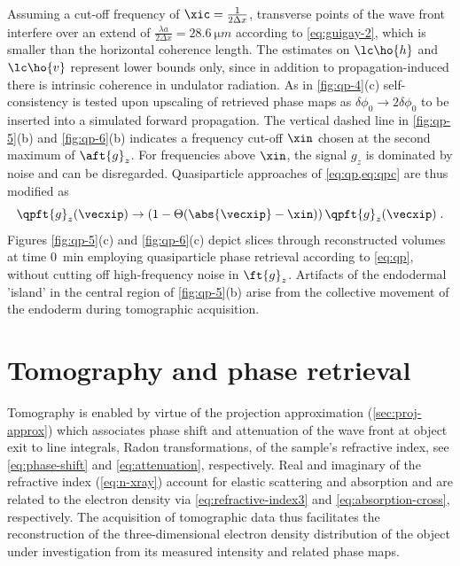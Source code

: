 \documentclass[
twoside,
openright,
titlepage,
numbers=noenddot,
headinclude,
fleqn,
a4paper,
footinclude=true,
cleardoublepage=empty,
abstractoff,
BCOR=5mm,
paper=a4,
fontsize=11pt,
british,ngerman,american,
]{scrreprt}
\begin{document}
Assuming a cut-off frequency of $\xic=\frac{1}{2\Delta x}$, transverse
points of the wave front interfere over an extend of $\frac{\lambda
  a}{2\Delta x}=\SI{28.6}{\micro m}$ according to \cref{eq:guigay-2},
which is smaller than the horizontal coherence length.  The estimates
on $\lc\ho{h}$ and $\lc\ho{v}$ represent lower bounds only, since in
addition to propagation-induced there is intrinsic coherence in
undulator radiation.  As in \cref{fig:qp-4}(c) self-consistency is
tested upon upscaling of retrieved phase maps as
$\delta\phi_0\to2\delta\phi_0$ to be inserted into a simulated forward
propagation.  The vertical dashed line in \cref{fig:qp-5}(b) and
\eqref{fig:qp-6}(b) indicates a frequency cut-off $\xin$ chosen at the
second maximum of $\aft{g}_z$.  For frequencies above $\xin$, the
signal $g_z$ is dominated by noise and can be disregarded.
Quasiparticle approaches of \cref{eq:qp,eq:qpc} are thus modified as
\begin{equation}
  \label{eq:mqp}
  \qpft{g}_z(\vecxip) \to 
  (1-\Theta(\abs{\vecxip}-\xin))\,\qpft{g}_z(\vecxip) \;.
\end{equation}
Figures \eqref{fig:qp-5}(c) and \eqref{fig:qp-6}(c) depict slices
through reconstructed volumes at time \SI{0}{min} employing
quasiparticle phase retrieval according to \cref{eq:qp}, \ie{} without
cutting off high-frequency noise in $\ft{g}_z$.  Artifacts of the
endodermal 'island' in the central region of \cref{fig:qp-5}(b) arise
from the collective movement of the endoderm during tomographic
acquisition.



\chapter{Tomography and phase retrieval}
\label{cha:tomography}

Tomography is enabled by virtue of the projection approximation
(\cref{sec:proj-approx}) which associates phase shift and attenuation
of the wave front at object exit to line integrals, \ie{} Radon
transformations, of the sample's refractive index, see
\cref{eq:phase-shift} and \cref{eq:attenuation}, respectively.  Real
and imaginary of the refractive index (\cref{eq:n-xray}) account for
elastic scattering and absorption and are related to the electron
density via \cref{eq:refractive-index3} and
\cref{eq:absorption-cross}, respectively.  The acquisition of
tomographic data thus facilitates the reconstruction of the
three-dimensional electron density distribution of the object under
investigation from its measured intensity and related phase maps.
\end{document}
